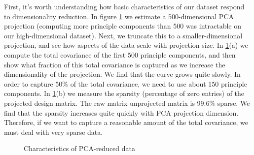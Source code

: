 
%


First, it's worth understanding how basic characteristics of our dataset respond to dimensionality reduction.  In figure \ref{fig:PCA_RED} we estimate a 500-dimensional PCA projection (computing more principle components than 500 was intractable on our high-dimensional dataset). Next, we truncate this to a smaller-dimensional projection, and see how aspects of the data scale with projection size. In  \ref{fig:PCA_RED}(a) we compute the total covariance of the first 500 principle components, and then show what fraction of this total covariance is captured as we increase the dimensionality of the projection. We find that the curve grows quite slowly. In order to capture 50\% of the total covariance, we need to use about 150 principle components. In  \ref{fig:PCA_RED}(b) we measure the sparsity (percentage of zero entries) of the projected design matrix. The raw matrix unprojected matrix is 99.6\% sparse. We find that the sparsity increases quite quickly with PCA projection dimension. Therefore, if we want to capture a reasonable amount of the total covariance, we must deal with very sparse data. 

\begin{figure}[!ht]
\centering
{}
\caption{Characteristics of PCA-reduced data}
\label{fig:PCA_RED}
\end{figure}

